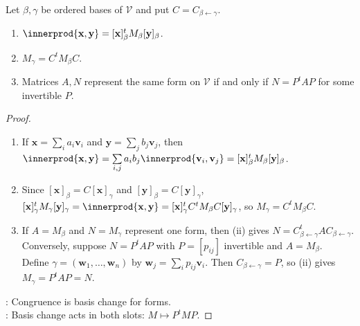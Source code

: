\begin{proposition} \label{prop:metric-form-matrix-recovery-and-congruence} \\
Let $\beta,\gamma$ be ordered bases of $\mathcal{V}$ and put $C=C_{\beta\leftarrow\gamma}$.
\begin{enumerate}[label=(\roman*)]
\setlength{\itemsep}{0pt}
\item $\innerprod{\mathbf{x},\mathbf{y}}=[\mathbf{x}]_{\beta}^{t}M_{\beta}[\mathbf{y}]_{\beta}$.
\item $M_{\gamma}=C^tM_{\beta}C$.
\item Matrices $A,N$ represent the same form on $\mathcal{V}$ if and only if $N=P^tAP$ for some invertible $P$.
\end{enumerate}
\begin{proof}
\begin{enumerate}[label=(\roman*)]
\setlength{\itemsep}{0pt}
\item If $\mathbf{x}=\sum\limits_i a_i\mathbf{v}_i$ and $\mathbf{y}=\sum\limits_j b_j\mathbf{v}_j$, then $\innerprod{\mathbf{x},\mathbf{y}} =\sum\limits_{i,j}a_i b_j\innerprod{\mathbf{v}_i,\mathbf{v}_j} =[\mathbf{x}]_{\beta}^{t}M_{\beta}[\mathbf{y}]_{\beta}$.
\item Since $[\mathbf{x}]_{\beta}=C[\mathbf{x}]_{\gamma}$ and $[\mathbf{y}]_{\beta}=C[\mathbf{y}]_{\gamma}$, $[\mathbf{x}]_{\gamma}^{t}M_{\gamma}[\mathbf{y}]_{\gamma} =\innerprod{\mathbf{x},\mathbf{y}} =[\mathbf{x}]_{\gamma}^{t}C^tM_{\beta}C[\mathbf{y}]_{\gamma}$, so $M_{\gamma}=C^tM_{\beta}C$.
\item If $A=M_{\beta}$ and $N=M_{\gamma}$ represent one form, then (ii) gives $N=C_{\beta\leftarrow\gamma}^tAC_{\beta\leftarrow\gamma}$.\\
Conversely, suppose $N=P^tAP$ with $P=[p_{ij}]$ invertible and $A=M_{\beta}$.\\
Define $\gamma=(\mathbf{w}_1,\ldots,\mathbf{w}_n)$ by $\mathbf{w}_j=\sum_i p_{ij}\mathbf{v}_i$. Then $C_{\beta\leftarrow\gamma}=P$, so (ii) gives $M_{\gamma}=P^tAP=N$.
\end{enumerate}
: Congruence is basis change for forms.\\
: Basis change acts in both slots: $M\mapsto P^tMP$.
\end{proof}
\end{proposition}

